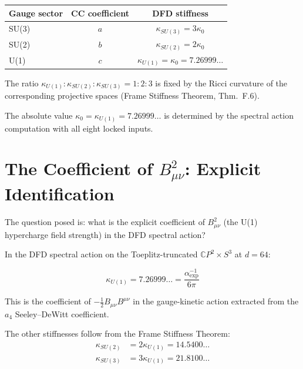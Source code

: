 \documentclass[12pt,a4paper]{article}
\begin{document}
\begin{center}
\renewcommand{\arraystretch}{1.2}
\begin{tabular}{lcc}
\toprule
Gauge sector & CC coefficient & DFD stiffness \\
\midrule
SU(3) & $a$ & $\kappa_{SU(3)} = 3\kappa_0$ \\
SU(2) & $b$ & $\kappa_{SU(2)} = 2\kappa_0$ \\
U(1)  & $c$ & $\kappa_{U(1)} = \kappa_0 = 7.26999\ldots$ \\
\bottomrule
\end{tabular}
\end{center}

The ratio $\kappa_{U(1)} : \kappa_{SU(2)} : \kappa_{SU(3)} = 1 : 2 : 3$
is fixed by the Ricci curvature of the corresponding projective spaces
(Frame Stiffness Theorem, Thm.~F.6).

The absolute value $\kappa_0 = \kappa_{U(1)} = 7.26999\ldots$ is
determined by the spectral action computation with all eight locked
inputs.

\section{The Coefficient of $B_{\mu\nu}^2$: Explicit Identification}
\label{sec:Bmunu}

The question posed is: what is the explicit coefficient of $B_{\mu\nu}^2$
(the U(1) hypercharge field strength) in the DFD spectral action?

\begin{tcolorbox}[colback=green!5!white, colframe=green!50!black,
  title=The U(1) Stiffness Coefficient]
In the DFD spectral action on the Toeplitz-truncated
$\mathbb{C}P^2 \times S^3$ at $d = 64$:

\begin{equation}
\boxed{\kappa_{U(1)} = 7.26999\ldots = \frac{\alpha^{-1}_{\mathrm{exp}}}{6\pi}}
\end{equation}

This is the coefficient of $-\frac{1}{2}B_{\mu\nu}B^{\mu\nu}$ in the
gauge-kinetic action extracted from the $a_4$ Seeley--DeWitt coefficient.

The other stiffnesses follow from the Frame Stiffness Theorem:
\begin{align}
\kappa_{SU(2)} &= 2\kappa_{U(1)} = 14.5400\ldots \\
\kappa_{SU(3)} &= 3\kappa_{U(1)} = 21.8100\ldots
\end{align}
\end{tcolorbox}
\end{document}
